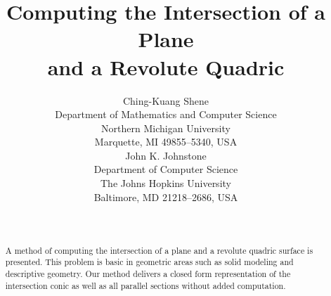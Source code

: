 %


\newif\ifFull
\Fulltrue

\def\thefootnote{\fnsymbol{footnote}}

\title{
     Computing the Intersection of a Plane \\
     and a Revolute Quadric}

\author{Ching-Kuang Shene\\
        Department of Mathematics and Computer Science \\
        Northern Michigan University \\
        Marquette, MI 49855--5340, USA\\[0.5cm]
        John K. Johnstone \\
        Department of Computer Science\\
        The Johns Hopkins University \\
        Baltimore, MD 21218--2686, USA}

\date{\ }

\newtheorem{example}{Example}[section]
\newtheorem{property}{Property}[section]
\newtheorem{definition}{Definition}[section]
\newtheorem{theorem}{Theorem}[section]
\newtheorem{lemma}{Lemma}[section]
\newtheorem{corollary}{Corollary}[section]

\newcommand{\DoubleSpace}{\edef\baselinestretch{1.4}\Large\normalsize}
\newcommand{\QED}{\ \ \ \rule{2mm}{3mm}\\}
\newcommand{\arrow}[1]{\vec{\bf #1}}

\setlength{\oddsidemargin}{0pt}
\setlength{\evensidemargin}{0pt}
\setlength{\headsep}{0pt}
\setlength{\topmargin}{0pt}
\setlength{\textheight}{8.75in}
\setlength{\textwidth}{6.5in}



\maketitle

\begin{abstract}
     A method of computing the intersection of a plane and a revolute quadric
surface is presented.  This problem is basic in geometric areas such as solid
modeling and descriptive geometry.   Our method delivers a closed form
representation of the intersection conic as well as all parallel sections
without added computation.
\end{abstract}




